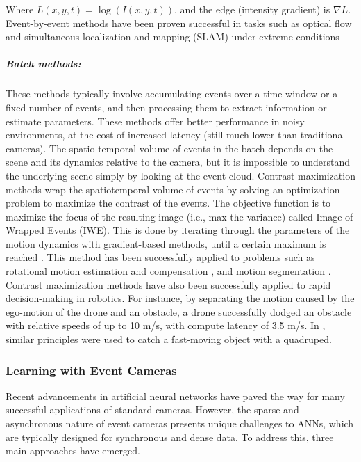 \documentclass{article}
\begin{document}
Where $L(x,y,t)=\log(I(x,y,t))$, and the edge (intensity gradient) is $\nabla L$. Event-by-event methods have been proven successful in tasks such as optical flow and simultaneous localization and mapping (SLAM) under extreme conditions \cite{vidalUltimateSLAMCombining2018, cuadradoOpticalFlowEstimation2023,gehrigERAFTDenseOptical2021, sunAutonomousQuadrotorFlight2021}

\subparagraph{Batch methods:} These methods typically involve accumulating events over a time window or a fixed number of events, and then processing them to extract information or estimate parameters. These methods offer better performance in noisy environments, at the cost of increased latency (still much lower than traditional cameras). The spatio-temporal volume of events in the batch depends on the scene and its dynamics relative to the camera, but it is impossible to understand the underlying scene simply by looking at the event cloud. Contrast maximization methods wrap the spatiotemporal volume of events by solving an optimization problem to maximize the contrast of the events. The objective function is to maximize the focus of the resulting image (i.e., max the variance) called Image of Wrapped Events (IWE). This is done by iterating through the parameters of the motion dynamics with gradient-based methods, until a certain maximum is reached \cite{gallegoUnifyingContrastMaximization2018a, gallegoEventbasedVisionSurvey2022, gallegoFocusAllYou2019}. This method has been successfully applied to problems such as rotational motion estimation and compensation \cite{gallegoAccurateAngularVelocity2017,xingEROAMEventbasedCamera2024}, and motion segmentation \cite{stoffregenEventBasedMotionSegmentation2019}. Contrast maximization methods have also been successfully applied to rapid decision-making in robotics. For instance, by separating the motion caused by the ego-motion of the drone and an obstacle, a drone successfully dodged an obstacle with relative speeds of up to 10 m/s, with compute latency of 3.5 m/s. In \cite{forraiEventbasedAgileObject2023}, similar principles were used to catch a fast-moving object with a quadruped.

\subsubsection{Learning with Event Cameras} Recent advancements in artificial neural networks have paved the way for many successful applications of standard cameras. However, the sparse and asynchronous nature of event cameras presents unique challenges to ANNs, which are typically designed for synchronous and dense data. To address this, three main approaches have emerged.
\end{document}
